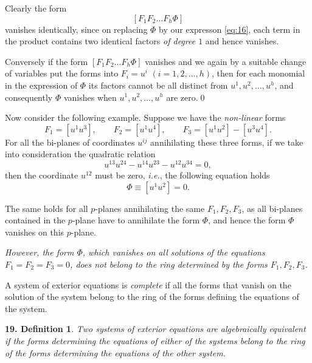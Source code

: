 Clearly the form
\[
[F_{1}F_{2}\dots F_{h}\Phi]
\]
vanishes identically, since on replacing $\Phi$ by our expresson \eqref{eq:16}, each term in the product contains two identical factors \emph{of degree $1$} and hence vanishes.

Conversely if the form $[F_{1}F_{2}\dots F_{h}\Phi]$ vanishes and we again by a suitable change of variables put the forms into $F_{i}=u^{i}$ $(i=1,2,\dots,h)$, then for each monomial in the expression of $\Phi$ its factors cannot be all distinct from $u^{1},u^{2},\dots,u^{h}$, and consequently $\Phi$ vanishes when $u^{1},u^{2},\dots,u^{h}$ are zero.\qed

\vspace{12pt}\fsec Now consider the following example. Suppose we have the \emph{non-linear} forms
\[
F_{1}=[u^{1}u^{3}],\qquad F_{2}=[u^{1}u^{4}],\qquad F_{3}=[u^{1}u^{2}]-[u^{3}u^{4}].
\]
For all the bi-planes of coordinates $u^{ij}$ annihilating these three forms, if we take into consideration the quadratic relation
\[
u^{13}u^{24}-u^{14}u^{23}-u^{12}u^{34}=0,
\]
then the coordinate $u^{12}$ must be zero, \emph{i.e.}, the following equation holds
\[
\Phi\equiv[u^{1}u^{2}]=0.
\]

The same holds for all $p$-planes annihilating the same $F_{1},F_{2},F_{3}$, as all bi-planes contained in the $p$-plane have to annihilate the form $\Phi$, and hence the form $\Phi$ vanishes on this $p$-plane.

\emph{However, the form $\Phi$, which vanishes on all solutions of the equations $F_{1}=F_{2}=F_{3}=0$, does not belong to the ring determined by the forms $F_{1},F_{2},F_{3}$.}

\begin{dfn*}
  A system of exterior equations is  \emph{complete}  if all the forms that vanish on the solution of the system belong to the ring of the forms defining the equations of the system.
\end{dfn*}

\vspace{6pt}\addtocounter{frenchsec}{1}
\theoremstyle{shape1}
\newtheorem*{def19}{\hspace{15pt}\textbf{19.} Definition}
\begin{def19}
  Two systems of exterior equations are  algebraically equivalent if the forms determining the equations of either of the systems belong to the ring of the forms determining the equations of the other system.
\end{def19}

